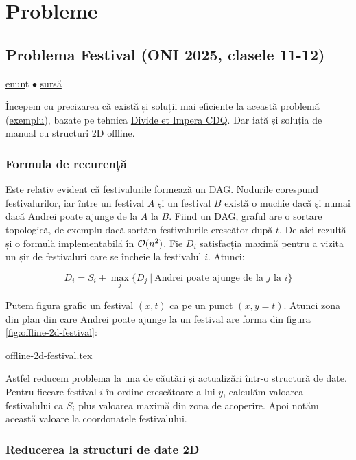 \documentclass[../main.tex]{subfiles}
\begin{document}
\section{Probleme}

\subsection{Problema Festival (ONI 2025, clasele 11-12)}
\label{problem:festival}

\href{https://kilonova.ro/problems/3720}{enunț}
$\bullet$
\hyperref[code:festival]{sursă}

Începem cu precizarea că există și soluții mai eficiente la această problemă (\href{https://kilonova.ro/submissions/1161191}{exemplu}), bazate pe tehnica \href{https://robert1003.github.io/2020/01/31/cdq-divide-and-conquer.html}{Divide et Impera CDQ}. Dar iată și soluția de manual cu structuri 2D offline.

\subsubsection*{Formula de recurență}

Este relativ evident că festivalurile formează un DAG. Nodurile corespund festivalurilor, iar între un festival $A$ și un festival $B$ există o muchie dacă și numai dacă Andrei poate ajunge de la $A$ la $B$. Fiind un DAG, graful are o sortare topologică, de exemplu dacă sortăm festivalurile crescător după $t$. De aici rezultă și o formulă implementabilă în $\mathcal{O}(n^2)$. Fie $D_i$ satisfacția maximă pentru a vizita un șir de festivaluri care se încheie la festivalul $i$. Atunci:

$$D_i = S_i + \max_{j} \{ D_j \ | \ \text{Andrei poate ajunge de la $j$ la $i$} \}$$

Putem figura grafic un festival $(x, t)$ ca pe un punct $(x, y=t)$. Atunci zona din plan din care Andrei poate ajunge la un festival are forma din figura \ref{fig:offline-2d-festival}:

{offline-2d-festival.tex}

Astfel reducem problema la una de căutări și actualizări într-o structură de date. Pentru fiecare festival $i$ în ordine crescătoare a lui $y$, calculăm valoarea festivalului ca $S_i$ plus valoarea maximă din zona de acoperire. Apoi notăm această valoare la coordonatele festivalului.

\subsubsection*{Reducerea la structuri de date 2D}
\end{document}
